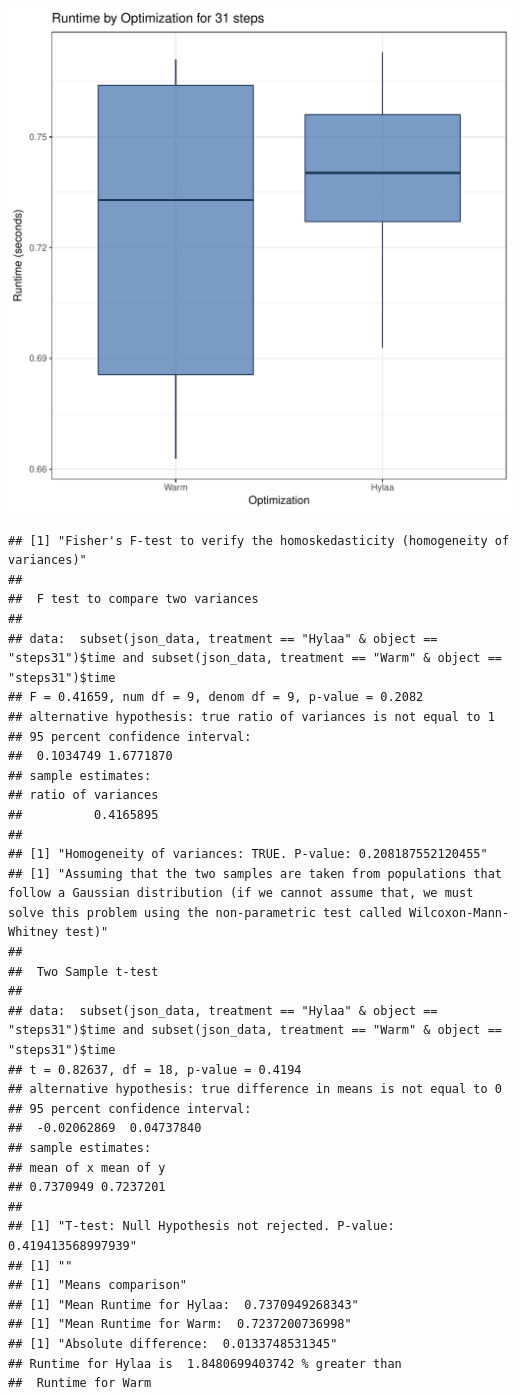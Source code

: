 \documentclass{article}\usepackage[]{graphicx}\usepackage[]{color}
\makeatletter
\def\maxwidth{ %
  \ifdim\Gin@nat@width>\linewidth
    \linewidth
  \else
    \Gin@nat@width
  \fi
}
\newenvironment{kframe}{%
 \def\at@end@of@kframe{}%
 \ifinner\ifhmode%
  \def\at@end@of@kframe{\end{minipage}}%
  \begin{minipage}{\columnwidth}%
 \fi\fi%
 \def\FrameCommand##1{\hskip\@totalleftmargin \hskip-\fboxsep
 \colorbox{shadecolor}{##1}\hskip-\fboxsep
     \hskip-\linewidth \hskip-\@totalleftmargin \hskip\columnwidth}%
 \MakeFramed {\advance\hsize-\width
   \@totalleftmargin\z@ \linewidth\hsize
   \@setminipage}}%
 {\par\unskip\endMakeFramed%
 \at@end@of@kframe}
\newenvironment{knitrout}{}{} %
\makeatother
\begin{document}
\begin{knitrout}
\color{fgcolor}
\includegraphics[width=\maxwidth]{figure/RH1_steps31-1} 
\begin{kframe}\begin{verbatim}
## [1] "Fisher's F-test to verify the homoskedasticity (homogeneity of variances)"
## 
## 	F test to compare two variances
## 
## data:  subset(json_data, treatment == "Hylaa" & object == "steps31")$time and subset(json_data, treatment == "Warm" & object == "steps31")$time
## F = 0.41659, num df = 9, denom df = 9, p-value = 0.2082
## alternative hypothesis: true ratio of variances is not equal to 1
## 95 percent confidence interval:
##  0.1034749 1.6771870
## sample estimates:
## ratio of variances 
##          0.4165895 
## 
## [1] "Homogeneity of variances: TRUE. P-value: 0.208187552120455"
## [1] "Assuming that the two samples are taken from populations that follow a Gaussian distribution (if we cannot assume that, we must solve this problem using the non-parametric test called Wilcoxon-Mann-Whitney test)"
## 
## 	Two Sample t-test
## 
## data:  subset(json_data, treatment == "Hylaa" & object == "steps31")$time and subset(json_data, treatment == "Warm" & object == "steps31")$time
## t = 0.82637, df = 18, p-value = 0.4194
## alternative hypothesis: true difference in means is not equal to 0
## 95 percent confidence interval:
##  -0.02062869  0.04737840
## sample estimates:
## mean of x mean of y 
## 0.7370949 0.7237201 
## 
## [1] "T-test: Null Hypothesis not rejected. P-value: 0.419413568997939"
## [1] ""
## [1] "Means comparison"
## [1] "Mean Runtime for Hylaa:  0.7370949268343"
## [1] "Mean Runtime for Warm:  0.7237200736998"
## [1] "Absolute difference:  0.0133748531345"
## Runtime for Hylaa is  1.8480699403742 % greater than 
##  Runtime for Warm
\end{verbatim}
\end{kframe}
\end{knitrout}
\end{document}
